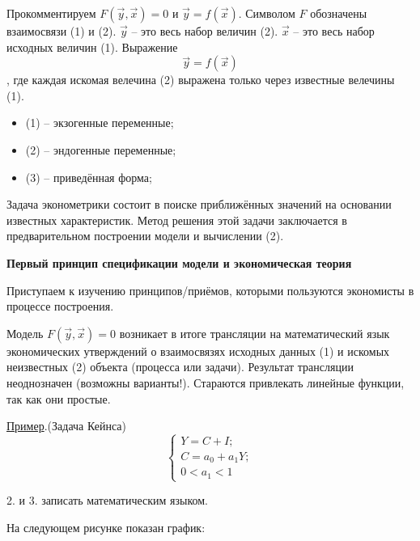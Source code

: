 \documentclass[12pt,a4paper]{article}
\begin{document}
Прокомментируем $F(\vec{y}, \vec{x}) = 0$ и $\vec{y} = f(\vec{x})$. Символом $F$ обозначены взаимосвязи (1) и (2). $\vec{y}$ -- это весь набор величин (2). $\vec{x}$ -- это весь набор исходных величин (1). Выражение\begin{equation}
\vec{y} = f(\vec{x})
\end{equation}
, где каждая искомая велечина (2) выражена только через известные велечины (1).
\begin{itemize}
\item (1) -- экзогенные переменные;
\item (2) -- эндогенные переменные;
\item (3) -- приведённая форма;
\end{itemize}
Задача эконометрики состоит в поиске приближённых значений на основании известных характеристик. Метод решения этой задачи заключается в предварительном построении модели и вычислении (2).

\textbf{Первый принцип спецификации модели и экономическая теория}

Приступаем к изучению принципов/приёмов, которыми пользуются экономисты в процессе построения.

Модель $F(\vec{y}, \vec{x}) = 0$ возникает в итоге трансляции на математический язык экономических утверждений о взаимосвязях исходных данных (1) и искомых неизвестных (2) объекта (процесса или задачи). Результат трансляции неоднозначен (возможны варианты!). Стараются привлекать линейные функции, так как они простые.

\underline{Пример}.(Задача Кейнса)
\begin{equation}
\begin{cases}
Y = C + I; \\
C = a_0 + a_1 Y; \\
0 < a_1 < 1
\end{cases}
\end{equation}

 2. и 3. записать математическим языком.

На следующем рисунке показан график:
\end{document}
